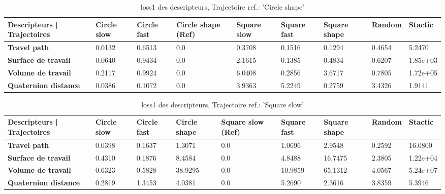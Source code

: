 \documentclass[8pt]{article}
\begin{document}
\begin{table}[H]
    \centering
    \begin{tabularx}{\textwidth}{|p{}|X|X|X|X|X|X|X|X|}
    \rowcolor{lightgray}
        \hline
        Descripteurs | Trajectoires &  Circle slow & Circle fast  & \cellcolor[HTML]{238CCC} \textbf{Circle shape (Ref)} & Square slow & Square fast & Square shape & Random & Stactic \\ \hline
        \textbf{Travel path} & 0.0132 & 0.6513 & 0.0 & 0.3708 & 0.1516 & 0.1294 & 0.4654 & 5.2470 \\ \hline
        \textbf{Surface de travail} & 0.0640 & 0.9434 & 0.0 & 2.1615 & 0.1385 & 0.4834 & 0.6207 & 1.85e+03 \\ \hline
        \textbf{Volume de travail} & 0.2117 & 0.9924 & 0.0 & 6.0408 & 0.2856 & 3.6717 & 0.7805 & 1.72e+05 \\ \hline
        \textbf{Quaternion distance} & 0.0386 & 0.1072 & 0.0 & 3.9363 & 5.2249 & 0.2759 & 3.4326 & 1.9141 \\ \hline  
    \end{tabularx}
        \caption{loss1 des descripteurs, Trajectoire ref.: 'Circle shape'}
\end{table}

\begin{table}[H]
    \centering
    \begin{tabularx}{\textwidth}{|p{}|X|X|X|X|X|X|X|X|}
    \rowcolor{lightgray}
        \hline
        Descripteurs | Trajectoires &  Circle slow & Circle fast  &  Circle shape  & \cellcolor[HTML]{238CCC} \textbf{Square slow (Ref)} & Square fast & Square shape & Random & Stactic \\ \hline
        \textbf{Travel path} & 0.0398 & 0.1637 & 1.3071 & 0.0 & 1.0696 & 2.9548 & 0.2592 & 16.0800 \\ \hline
        \textbf{Surface de travail} & 0.4310 & 0.1876 & 8.4584 & 0.0 & 4.8488 & 16.7475 & 2.3805 & 1.22e+04 \\ \hline
        \textbf{Volume de travail} & 0.6323 & 0.5828 & 38.9295 & 0.0 & 10.9859 & 65.1312 & 4.0567 & 5.24e+07 \\ \hline
        \textbf{Quaternion distance} & 0.2819 & 1.3453 & 4.0381 & 0.0 & 5.2690 & 2.3616 & 3.8359 & 5.3946 \\ \hline  
    \end{tabularx}
        \caption{loss1 des descripteurs, Trajectoire ref.: 'Square slow'}
\end{table}
\end{document}
